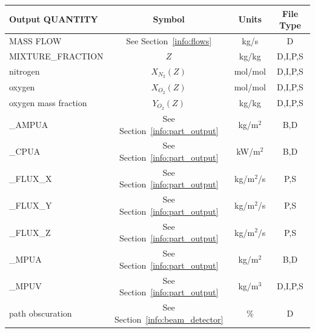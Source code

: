 \documentclass[11pt]{book}
\begin{document}
\begin{table}[h!]
\begin{center}
\begin{tabular}{|l|c|c|c|}
\hline
Output {\ct QUANTITY}                           & Symbol                                        & Units          & File Type    \\ \hline \hline
{\ct MASS FLOW}                                 & See Section~\ref{info:flows}                  & kg/s           & D            \\ \hline
{\ct MIXTURE\_FRACTION}                         & $Z$                                           & kg/kg          & D,I,P,S      \\ \hline
{\ct nitrogen}                                  & $X_{N_2}(Z)$                                  & mol/mol        & D,I,P,S      \\ \hline
{\ct oxygen}                                    & $X_{O_2}(Z)$                                  & mol/mol        & D,I,P,S      \\ \hline
{\ct oxygen mass fraction}                      & $Y_{O_2}(Z)$                                  & kg/kg          & D,I,P,S      \\ \hline
{\ct [PART\_ID]\_AMPUA}                         & See Section~\ref{info:part_output}            & kg/m$^2$       & B,D          \\ \hline
{\ct [PART\_ID]\_CPUA}                          & See Section~\ref{info:part_output}            & kW/m$^2$       & B,D          \\ \hline
{\ct [PART\_ID]\_FLUX\_X}                       & See Section~\ref{info:part_output}            & kg/m$^2$/s     & P,S          \\ \hline
{\ct [PART\_ID]\_FLUX\_Y}                       & See Section~\ref{info:part_output}            & kg/m$^2$/s     & P,S          \\ \hline
{\ct [PART\_ID]\_FLUX\_Z}                       & See Section~\ref{info:part_output}            & kg/m$^2$/s     & P,S          \\ \hline
{\ct [PART\_ID]\_MPUA}                          & See Section~\ref{info:part_output}            & kg/m$^2$       & B,D          \\ \hline
{\ct [PART\_ID]\_MPUV}                          & See Section~\ref{info:part_output}            & kg/m$^3$       & D,I,P,S      \\ \hline
{\ct path obscuration}                          & See Section~\ref{info:beam_detector}          & \%             & D            \\ \hline

\end{tabular}
\end{center}
\end{table}
\end{document}

